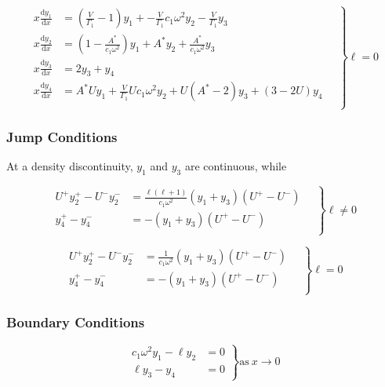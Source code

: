 \documentclass[fleqn]{article}
\newcommand{\diff}{\ensuremath{\mathrm{d}}}
\newcommand{\Vg}{\ensuremath{\frac{V}{\Gamma_{1}}}}
\newcommand{\As}{\ensuremath{A^{\ast}}}
\begin{document}
\begin{equation*}
\left.
\begin{aligned}
x \frac{\diff y_{1}}{\diff x} &=
\left(\Vg - 1 \right) y_{1} +
- \Vg c_{1} \omega^{2} y_{2} -
\Vg y_{3} \\
x \frac{\diff y_{2}}{\diff x} &=
(1 - \frac{\As}{c_{1} \omega^{2}} ) y_{1} +
\As y_{2} +
\frac{\As}{c_{1} \omega^{2}} y_{3} \\
x \frac{\diff y_{3}}{\diff x} &=
2 y_{3} + y_{4} \\
x \frac{\diff y_{4}}{\diff x} &=
\As U y_{1} +
\Vg U c_{1} \omega^{2} y_{2} +
U (\As - 2) y_{3} +
(3 - 2 U) y_{4} \\
\end{aligned}
\quad \right\} \ell = 0
\end{equation*}

\subsubsection*{Jump Conditions}

At a density discontinuity, $y_{1}$ and $y_{3}$ are continuous, while

\begin{equation*}
\left.
\begin{aligned}
U^{+} y_{2}^{+} - U^{-} y_{2}^{-} &= \frac{\ell(\ell+1)}{c_{1}\omega^{2}}(y_{1} + y_{3}) (U^{+} - U^{-}) \\
y_{4}^{+} - y_{4}^{-} &= -(y_{1}+y_{3}) (U^{+} - U^{-}) \\
\end{aligned}
\quad \right\} \ell \neq 0
\end{equation*}

\begin{equation*}
\left.
\begin{aligned}
U^{+} y_{2}^{+} - U^{-} y_{2}^{-} &= \frac{1}{c_{1}\omega^{2}}(y_{1} + y_{3}) (U^{+} - U^{-}) \\
y_{4}^{+} - y_{4}^{-} &= -(y_{1}+y_{3}) (U^{+} - U^{-}) \\
\end{aligned}
\quad \right\} \ell = 0
\end{equation*}

\subsubsection*{Boundary Conditions}

\begin{equation*}
\left.
\begin{aligned}
c_{1} \omega^{2} y_{1} - \ell y_{2} &= 0 \\
\ell y_{3} - y_{4} &= 0
\end{aligned}
\right\}
\text{as}\ x \rightarrow 0
\end{equation*}
\end{document}
